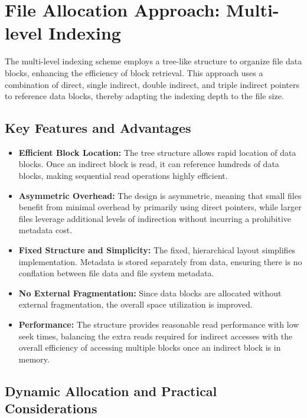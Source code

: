 \documentclass[../../compsys.tex]{subfiles}
\begin{document}
\section{File Allocation Approach: Multi-level Indexing}

The multi-level indexing scheme employs a tree-like structure to organize file data blocks, enhancing the efficiency of block retrieval. This approach uses a combination of direct, single indirect, double indirect, and triple indirect pointers to reference data blocks, thereby adapting the indexing depth to the file size.

\subsection*{Key Features and Advantages}

\begin{itemize}
    \item \textbf{Efficient Block Location:} The tree structure allows rapid location of data blocks. Once an indirect block is read, it can reference hundreds of data blocks, making sequential read operations highly efficient.
    
    \item \textbf{Asymmetric Overhead:} The design is asymmetric, meaning that small files benefit from minimal overhead by primarily using direct pointers, while larger files leverage additional levels of indirection without incurring a prohibitive metadata cost.
    
    \item \textbf{Fixed Structure and Simplicity:} The fixed, hierarchical layout simplifies implementation. Metadata is stored separately from data, ensuring there is no conflation between file data and file system metadata.
    
    \item \textbf{No External Fragmentation:} Since data blocks are allocated without external fragmentation, the overall space utilization is improved.
    
    \item \textbf{Performance:} The structure provides reasonable read performance with low seek times, balancing the extra reads required for indirect accesses with the overall efficiency of accessing multiple blocks once an indirect block is in memory.
\end{itemize}

\subsection*{Dynamic Allocation and Practical Considerations}
\end{document}
